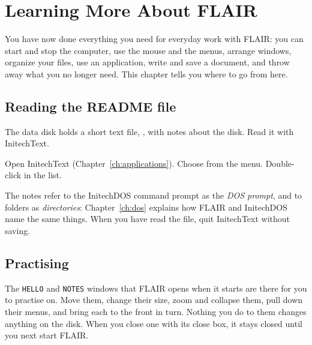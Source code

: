 \chapter{Learning More About FLAIR}
\label{ch:learning}

You have now done everything you need for everyday work with FLAIR: you
can start and stop the computer, use the mouse and the menus, arrange
windows, organize your files, use an application, write and save a
document, and throw away what you no longer need.  This chapter tells you
where to go from here.

\section{Reading the README file}
The data disk holds a short text file, , with notes about
the disk.  Read it with InitechText.
\begin{TaskSteps}
\Step Open InitechText (Chapter~\ref{ch:applications}).
\Step Choose  from the  menu.
\Step Double-click  in the list.
\end{TaskSteps}


The notes refer to the InitechDOS command prompt as the \textit{DOS
prompt}, and to folders as \textit{directories}: Chapter~\ref{ch:dos}
explains how FLAIR and InitechDOS name the same things.  When you have read
the file, quit InitechText without saving.

\section{Practising}
The \texttt{HELLO} and \texttt{NOTES} windows that FLAIR opens when it
starts are there for you to practise on.  Move them, change their size,
zoom and collapse them, pull down their menus, and bring each to the front
in turn.  Nothing you do to them changes anything on the disk.  When you
close one with its close box, it stays closed until you next start FLAIR.

